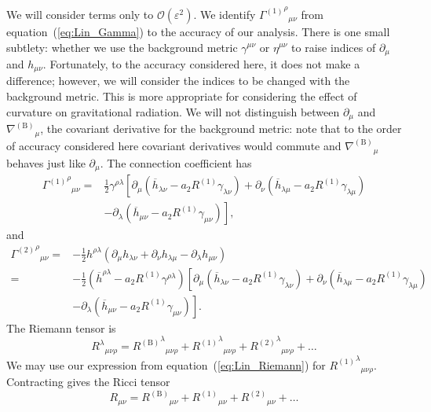 \documentclass[a4paper, 11pt, titlepage, twoside]{report}
\newcommand{\eqnref}[1]{equation~(\ref{eq:#1})}
\newcommand{\order}[1]{\ensuremath{\mathcal{O}({#1})}}
\begin{document}
We will consider terms only to $\order{\varepsilon^2}$. We identify ${{\Gamma^{(1)}}^\rho}_{\mu\nu}$ from \eqnref{Lin_Gamma} to the accuracy of our analysis. There is one small subtlety: whether we use the background metric $\gamma^{\mu\nu}$ or $\eta^{\mu\nu}$ to raise indices of $\partial_\mu$ and $h_{\mu\nu}$. Fortunately, to the accuracy considered here, it does not make a difference; however, we will consider the indices to be changed with the background metric. This is more appropriate for considering the effect of curvature on gravitational radiation. We will not distinguish between $\partial_\mu$ and ${\nabla^{(\mathrm{B})}}_\mu$, the covariant derivative for the background metric: note that to the order of accuracy considered here covariant derivatives would commute and ${\nabla^{(\mathrm{B})}}_\mu$ behaves just like $\partial_\mu$. The connection coefficient has
\begin{align}
{{\Gamma^{(1)}}^\rho}_{\mu\nu} = {} & \frac{1}{2}\gamma^{\rho\lambda}\left[\partial_\mu \left(\overline{h}_{\lambda\nu} - a_2 R^{(1)}\gamma_{\lambda\nu}\right) + \partial_\nu \left(\overline{h}_{\lambda\mu} - a_2 R^{(1)}\gamma_{\lambda\mu}\right) \right. \nonumber \\
  & - \left. \partial_\lambda \left(\overline{h}_{\mu\nu} - a_2 R^{(1)}\gamma_{\mu\nu}\right)\right],
\end{align}
and
\begin{align}
{{\Gamma^{(2)}}^\rho}_{\mu\nu} = {} & -\frac{1}{2}h^{\rho\lambda}(\partial_\mu h_{\lambda\nu} + \partial_\nu h_{\lambda\mu} - \partial_\lambda h_{\mu\nu}) \nonumber \\
 = {} & -\frac{1}{2}\left(\overline{h}^{\rho\lambda} - a_2 R^{(1)}\gamma^{\rho\lambda}\right)\left[\partial_\mu \left(\overline{h}_{\lambda\nu} - a_2 R^{(1)}\gamma_{\lambda\nu}\right) + \partial_\nu \left(\overline{h}_{\lambda\mu} - a_2 R^{(1)}\gamma_{\lambda\mu}\right) \right. \nonumber \\
 & - \left. \partial_\lambda \left(\overline{h}_{\mu\nu} - a_2 R^{(1)}\gamma_{\mu\nu}\right)\right].
\end{align}
The Riemann tensor is
\begin{equation}
{R^\lambda}_{\mu\nu\rho} = {{R^{(\mathrm{B})}}^\lambda}_{\mu\nu\rho} + {{R^{(1)}}^\lambda}_{\mu\nu\rho} + {{R^{(2)}}^\lambda}_{\mu\nu\rho} + \ldots
\end{equation}
We may use our expression from \eqnref{Lin_Riemann} for ${{R^{(1)}}^\lambda}_{\mu\nu\rho}$. Contracting gives the Ricci tensor
\begin{equation}
{R}_{\mu\nu} = {R^{(\mathrm{B})}}_{\mu\nu} + {R^{(1)}}_{\mu\nu} + {R^{(2)}}_{\mu\nu} + \ldots
\end{equation}
\end{document}

